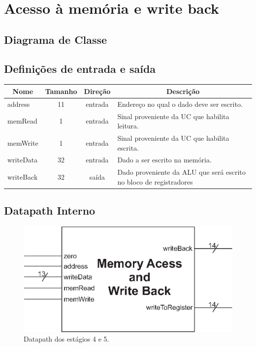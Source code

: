 \section{Acesso à memória e write back}
	\subsection{Diagrama de Classe}
  \begin{figure}[H]
    
  \end{figure}

\subsection{Definições de entrada e saída}

	\begin{center}
        \begin{longtable}[pos]{| l | c | c | m{7cm} |} \hline
          \multicolumn{1}{|c|}{\cellcolor[gray]{0.9}\textbf{Nome}} & 
          \multicolumn{1}{c|}{\cellcolor[gray]{0.9}\textbf{Tamanho}} & 
          \multicolumn{1}{c|}{\cellcolor[gray]{0.9}\textbf{Direção}} &
          \multicolumn{1}{c|}{\cellcolor[gray]{0.9}\textbf{Descrição}} \\ \hline
          \endhead
          \hline
          \endlastfoot

          address                  & 11  & entrada   & Endereço no qual o dado deve ser escrito.    \\ \hline
          memRead                  & 1   & entrada   & Sinal proveniente da UC que habilita leitura.    \\ \hline
          memWrite                 & 1   & entrada   & Sinal proveniente da UC que habilita escrita.    \\ \hline
          writeData      		   & 32   & entrada   & Dado a ser escrito na memória. \\ \hline
          writeBack	               & 32  & saída     & Dado proveniente da ALU que será escrito no bloco de registradores\\ \hline
        \end{longtable}
      \end{center}
      
\subsection{Datapath Interno}
	
	\begin{figure}[ht]
		\begin{center}
		\includegraphics{./datapath/Graphic4.eps}
		\caption*{Datapath dos estágios 4 e 5.}
		\end{center}
	\end{figure}